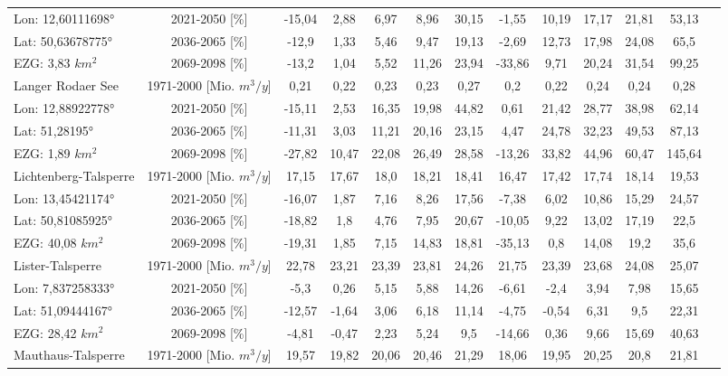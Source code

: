 \begin{longtable}{@{\extracolsep{\fill}}lc|ccccc||cccccc}
\cline{2-13} 
Lon: 12,60111698° & 2021-2050 [\%]  & -15,04 & 2,88 & 6,97 & 8,96 & 30,15 & -1,55 & 10,19 & 17,17 & 21,81 & 53,13 & \\ 
Lat: 50,63678775° & 2036-2065 [\%]  & -12,9 & 1,33 & 5,46 & 9,47 & 19,13 & -2,69 & 12,73 & 17,98 & 24,08 & 65,5 & \\ 
EZG: 3,83 $km^2$ & 2069-2098 [\%]  & -13,2 & 1,04 & 5,52 & 11,26 & 23,94 & -33,86 & 9,71 & 20,24 & 31,54 & 99,25 & \\ 
\hline 
Langer Rodaer See & 1971-2000 [Mio. $m^3/y$]  & 0,21 & 0,22 & 0,23 & 0,23 & 0,27 & 0,2 & 0,22 & 0,24 & 0,24 & 0,28 & \\ 
\cline{2-13} 
Lon: 12,88922778° & 2021-2050 [\%]  & -15,11 & 2,53 & 16,35 & 19,98 & 44,82 & 0,61 & 21,42 & 28,77 & 38,98 & 62,14 & \\ 
Lat: 51,28195° & 2036-2065 [\%]  & -11,31 & 3,03 & 11,21 & 20,16 & 23,15 & 4,47 & 24,78 & 32,23 & 49,53 & 87,13 & \\ 
EZG: 1,89 $km^2$ & 2069-2098 [\%]  & -27,82 & 10,47 & 22,08 & 26,49 & 28,58 & -13,26 & 33,82 & 44,96 & 60,47 & 145,64 & \\ 
\hline 
Lichtenberg-Talsperre & 1971-2000 [Mio. $m^3/y$]  & 17,15 & 17,67 & 18,0 & 18,21 & 18,41 & 16,47 & 17,42 & 17,74 & 18,14 & 19,53 & \\ 
\cline{2-13} 
Lon: 13,45421174° & 2021-2050 [\%]  & -16,07 & 1,87 & 7,16 & 8,26 & 17,56 & -7,38 & 6,02 & 10,86 & 15,29 & 24,57 & \\ 
Lat: 50,81085925° & 2036-2065 [\%]  & -18,82 & 1,8 & 4,76 & 7,95 & 20,67 & -10,05 & 9,22 & 13,02 & 17,19 & 22,5 & \\ 
EZG: 40,08 $km^2$ & 2069-2098 [\%]  & -19,31 & 1,85 & 7,15 & 14,83 & 18,81 & -35,13 & 0,8 & 14,08 & 19,2 & 35,6 & \\ 
\hline 
Lister-Talsperre & 1971-2000 [Mio. $m^3/y$]  & 22,78 & 23,21 & 23,39 & 23,81 & 24,26 & 21,75 & 23,39 & 23,68 & 24,08 & 25,07 & \\ 
\cline{2-13} 
Lon: 7,837258333° & 2021-2050 [\%]  & -5,3 & 0,26 & 5,15 & 5,88 & 14,26 & -6,61 & -2,4 & 3,94 & 7,98 & 15,65 & \\ 
Lat: 51,09444167° & 2036-2065 [\%]  & -12,57 & -1,64 & 3,06 & 6,18 & 11,14 & -4,75 & -0,54 & 6,31 & 9,5 & 22,31 & \\ 
EZG: 28,42 $km^2$ & 2069-2098 [\%]  & -4,81 & -0,47 & 2,23 & 5,24 & 9,5 & -14,66 & 0,36 & 9,66 & 15,69 & 40,63 & \\ 
\hline 
Mauthaus-Talsperre & 1971-2000 [Mio. $m^3/y$]  & 19,57 & 19,82 & 20,06 & 20,46 & 21,29 & 18,06 & 19,95 & 20,25 & 20,8 & 21,81 & \\ 

\end{longtable}
